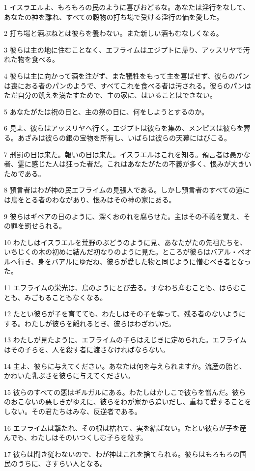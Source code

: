 \par 1 イスラエルよ、もろもろの民のように喜びおどるな。あなたは淫行をなして、あなたの神を離れ、すべての穀物の打ち場で受ける淫行の価を愛した。
\par 2 打ち場と酒ぶねとは彼らを養わない。また新しい酒もむなしくなる。
\par 3 彼らは主の地に住むことなく、エフライムはエジプトに帰り、アッスリヤで汚れた物を食べる。
\par 4 彼らは主に向かって酒を注がず、また犠牲をもって主を喜ばせず、彼らのパンは喪におる者のパンのようで、すべてこれを食べる者は汚される。彼らのパンはただ自分の飢えを満たすためで、主の家に、はいることはできない。
\par 5 あなたがたは祝の日と、主の祭の日に、何をしようとするのか。
\par 6 見よ、彼らはアッスリヤへ行く。エジプトは彼らを集め、メンピスは彼らを葬る。あざみは彼らの銀の宝物を所有し、いばらは彼らの天幕にはびこる。
\par 7 刑罰の日は来た。報いの日は来た。イスラエルはこれを知る。預言者は愚かな者、霊に感じた人は狂った者だ。これはあなたがたの不義が多く、恨みが大きいためである。
\par 8 預言者はわが神の民エフライムの見張人である。しかし預言者のすべての道には鳥をとる者のわながあり、恨みはその神の家にある。
\par 9 彼らはギベアの日のように、深くおのれを腐らせた。主はその不義を覚え、その罪を罰せられる。
\par 10 わたしはイスラエルを荒野のぶどうのように見、あなたがたの先祖たちを、いちじくの木の初めに結んだ初なりのように見た。ところが彼らはバアル・ペオルへ行き、身をバアルにゆだね、彼らが愛した物と同じように憎むべき者となった。
\par 11 エフライムの栄光は、鳥のようにとび去る。すなわち産むことも、はらむことも、みごもることもなくなる。
\par 12 たとい彼らが子を育てても、わたしはその子を奪って、残る者のないようにする。わたしが彼らを離れるとき、彼らはわざわいだ。
\par 13 わたしが見たように、エフライムの子らはえじきに定められた。エフライムはその子らを、人を殺す者に渡さなければならない。
\par 14 主よ、彼らに与えてください。あなたは何を与えられますか。流産の胎と、かわいた乳ぶさを彼らに与えてください。
\par 15 彼らのすべての悪はギルガルにある。わたしはかしこで彼らを憎んだ。彼らのおこないの悪しきがゆえに、彼らをわが家から追いだし、重ねて愛することをしない。その君たちはみな、反逆者である。
\par 16 エフライムは撃たれ、その根は枯れて、実を結ばない。たとい彼らが子を産んでも、わたしはそのいつくしむ子らを殺す。
\par 17 彼らは聞き従わないので、わが神はこれを捨てられる。彼らはもろもろの国民のうちに、さすらい人となる。

